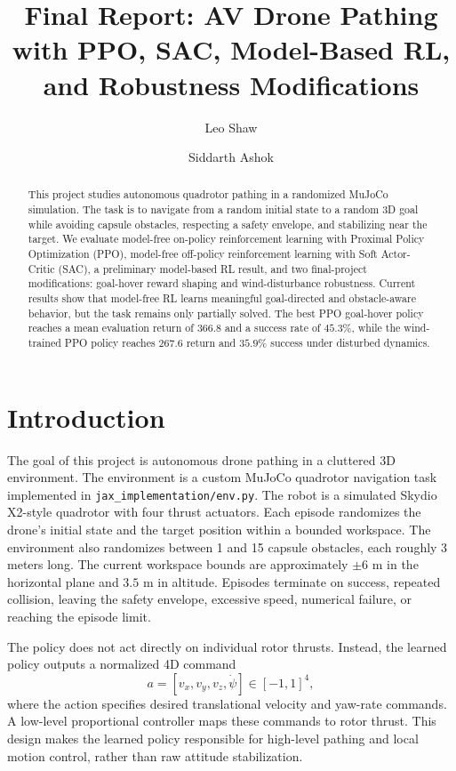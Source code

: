 \documentclass{article}
\title{Final Report: AV Drone Pathing with PPO, SAC, Model-Based RL, and Robustness Modifications}
\author{Leo Shaw \and Siddarth Ashok}
\date{}
\begin{document}
\maketitle

\begin{abstract}
This project studies autonomous quadrotor pathing in a randomized MuJoCo simulation. The task is to navigate from a random initial state to a random 3D goal while avoiding capsule obstacles, respecting a safety envelope, and stabilizing near the target. We evaluate model-free on-policy reinforcement learning with Proximal Policy Optimization (PPO), model-free off-policy reinforcement learning with Soft Actor-Critic (SAC), a preliminary model-based RL result, and two final-project modifications: goal-hover reward shaping and wind-disturbance robustness. Current results show that model-free RL learns meaningful goal-directed and obstacle-aware behavior, but the task remains only partially solved. The best PPO goal-hover policy reaches a mean evaluation return of $366.8$ and a success rate of $45.3\%$, while the wind-trained PPO policy reaches $267.6$ return and $35.9\%$ success under disturbed dynamics.
\end{abstract}

\section{Introduction}
The goal of this project is autonomous drone pathing in a cluttered 3D environment. The environment is a custom MuJoCo quadrotor navigation task implemented in \texttt{jax\_implementation/env.py}. The robot is a simulated Skydio X2-style quadrotor with four thrust actuators. Each episode randomizes the drone's initial state and the target position within a bounded workspace. The environment also randomizes between 1 and 15 capsule obstacles, each roughly 3 meters long. The current workspace bounds are approximately $\pm 6$ m in the horizontal plane and $3.5$ m in altitude. Episodes terminate on success, repeated collision, leaving the safety envelope, excessive speed, numerical failure, or reaching the episode limit.

The policy does not act directly on individual rotor thrusts. Instead, the learned policy outputs a normalized 4D command
\[
a = [v_x, v_y, v_z, \dot{\psi}] \in [-1,1]^4,
\]
where the action specifies desired translational velocity and yaw-rate commands. A low-level proportional controller maps these commands to rotor thrust. This design makes the learned policy responsible for high-level pathing and local motion control, rather than raw attitude stabilization.
\end{document}
